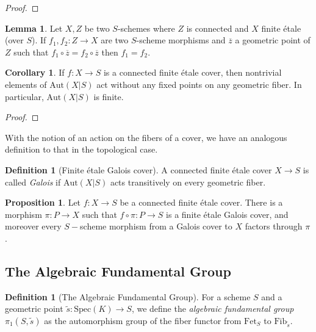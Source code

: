 \documentclass{article}
\theoremstyle{definition}
\newtheorem{lemma}[theorem]{Lemma}
\newtheorem{corollary}[theorem]{Corollary}
\newtheorem{proposition}[theorem]{Proposition}
\newtheorem{definition}[theorem]{Definition}
\theoremstyle{remark}
\begin{document}
\begin{proof}
\end{proof}

\begin{lemma}
	Let $X, Z$ be two $S$-schemes where $Z$ is connected and $X$ finite \'etale (over $S$). 
	If $f_1, f_2: Z \to X$ are two $S$-scheme morphisms and $\overline{z}$ a geometric point of $Z$  such that $f_1 \circ \overline{z} = f_2 \circ \overline{z}$ then $f_1 = f_2$.
\end{lemma}

\begin{corollary}
	If $f: X \to S$ is a connected finite \'etale cover, then nontrivial elements of $\text{Aut}(X|S)$ act without any fixed points on any geometric fiber.
	In particular, $\text{Aut}(X|S)$ is finite.
\end{corollary}

\begin{proof}
\end{proof}

With the notion of an action on the fibers of a cover, we have an analogous definition to that in the topological case.

\begin{definition}[Finite \'etale Galois cover]
	A connected finite \'etale cover $X \to S$ is called \textit{Galois} if $\text{Aut}(X|S)$ acts transitively on every geometric fiber.
\end{definition}

\begin{proposition}
	Let $f: X \to S$ be a connected finite \'etale cover. 
	There is a morphism $\pi: P \to X$ such that $f \circ \pi: P \to S$ is a finite \'etale Galois cover, and moreover every $S-$scheme morphism from a Galois cover to $X$ factors through $\pi$.
\end{proposition}

\subsection{The Algebraic Fundamental Group}


\begin{definition}[The Algebraic Fundamental Group]
	For a scheme $S$ and a geometric point $\widetilde{s}: \text{Spec}(K) \to S$, we define the \textit{algebraic fundamental group} $\pi_1(S, \widetilde{s})$ as the automorphism group of the fiber functor from $\text{Fet}_{S}$ to $\text{Fib}_{\widetilde{s}}$.
\end{definition}
\end{document}
